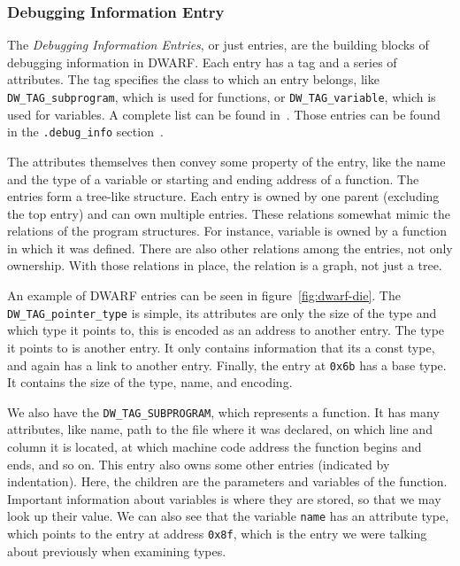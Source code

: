 \subsubsection{Debugging Information Entry}
The \textit{Debugging Information Entries}, or just entries, are the building
blocks of debugging information in DWARF. Each entry has a tag and a series of
attributes. The tag specifies the class to which an entry belongs, like
\verb|DW_TAG_subprogram|, which is used for functions, or
\verb|DW_TAG_variable|, which is used for variables. A complete list can be
found in~\cite{dwarf}. Those entries can be found in the \verb|.debug_info|
section~\cite{dwarf}. 

The attributes themselves then convey some property of the entry, like the name
and the type of a variable or starting and ending address of a function. The
entries form a tree-like structure. Each entry is owned by one parent
(excluding the top entry) and can own multiple entries. These relations
somewhat mimic the relations of the program structures. For instance, variable
is owned by a function in which it was defined. There are also other relations
among the entries, not only ownership. With those relations in place, the
relation is a graph, not just a tree.

An example of DWARF entries can be seen in figure~\ref{fig:dwarf-die}. The
\verb|DW_TAG_pointer_type| is simple, its attributes are only the size of
the type and which type it points to, this is encoded as an address to another
entry. The type it points to is another entry. It only contains information that
its a const type, and again has a link to another entry. Finally, the entry at
\texttt{0x6b} has a base type. It contains the size of the type, name, and
encoding. 

We also have the \verb|DW_TAG_SUBPROGRAM|, which represents a function. It
has many attributes, like name, path to the file where it was declared, on
which line and column it is located, at which machine code address the function
begins and ends, and so on. This entry also owns some other entries (indicated
by indentation). Here, the children are the parameters and variables of the
function. Important information about variables is where they are stored, so
that we may look up their value. We can also see that the variable
\texttt{name} has an attribute type, which points to the entry at address
\texttt{0x8f}, which is the entry we were talking about previously when
examining types.

